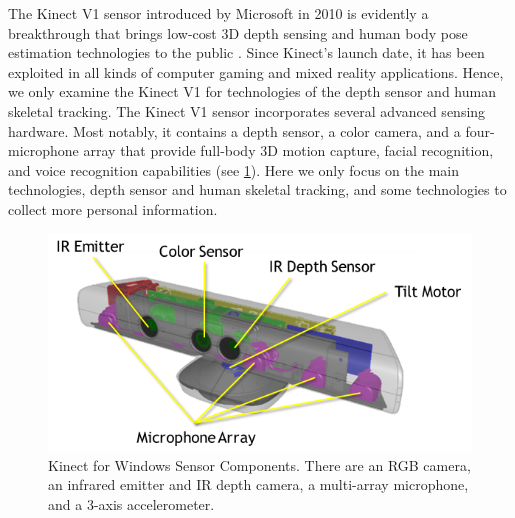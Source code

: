 The Kinect V1 sensor introduced by Microsoft in 2010 is evidently a breakthrough that brings low-cost 3D depth sensing and human body pose estimation technologies to the public \cite{Zhang2012b}. 
Since Kinect's launch date, it has been exploited in all kinds of computer gaming and mixed reality applications. 
Hence, we only examine the Kinect V1 for technologies of the depth sensor and human skeletal tracking.
The Kinect V1 sensor incorporates several advanced sensing hardware. Most notably, it contains a depth sensor, a color camera, and a four-microphone array that provide full-body 3D motion capture, facial recognition, and voice recognition capabilities (see \figurename{\ref{fig:2-bg:kinect}}). Here we only focus on the main technologies, depth sensor and human skeletal tracking, and some technologies to collect more personal information.
\begin{figure}
	\centering
	\includegraphics[width=0.7\linewidth]{figures/2-bg/kinect}
	\caption{Kinect for Windows Sensor Components. There are an RGB camera, an infrared emitter and IR depth camera, a multi-array microphone, and a 3-axis accelerometer.}
	\label{fig:2-bg:kinect}
\end{figure}

